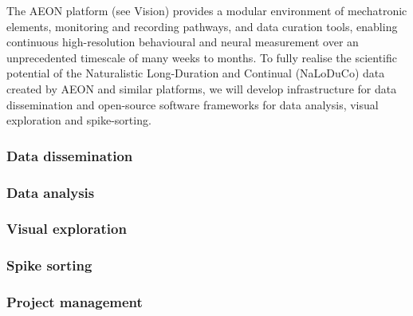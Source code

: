 The AEON platform (see Vision) provides a modular environment of mechatronic
elements, monitoring and recording pathways, and data curation tools, enabling
continuous high-resolution behavioural and neural measurement over an
unprecedented timescale of many weeks to months.  To fully realise the
scientific potential of the Naturalistic Long-Duration and Continual (NaLoDuCo)
data created by AEON and similar platforms, we will develop infrastructure for
data dissemination and open-source software frameworks for data analysis,
visual exploration and spike-sorting.

\subsubsection{Data dissemination}
\label{sec:dataDissemination}

% 

\subsubsection{Data analysis}
\label{sec:dataAnalysis}



\subsubsection{Visual exploration}
\label{sec:visualExploration}



\subsubsection{Spike sorting}
\label{sec:spikeSorting}



\subsubsection{Project management}
\label{sec:projectMgmt}




